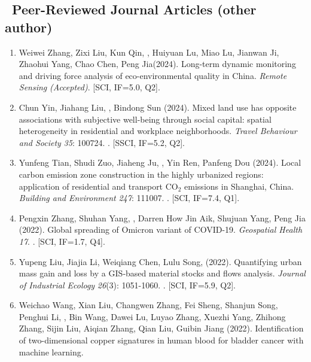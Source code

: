 \subsection*{\texorpdfstring{\faBook\ Peer-Reviewed Journal Articles (other author)}{Other Peer-Reviewed Journal Articles (other author)}}
\begin{enumerate}
\item
    Weiwei Zhang, Zixi Liu, Kun Qin, \Shaoqing, Huiyuan Lu, Miao Lu, Jianwan Ji, Zhaohui Yang, Chao Chen, Peng Jia\CS (2024).
    Long-term dynamic monitoring and driving force analysis of eco-environmental quality in China. 
    \textit{Remote Sensing} \textit{(Accepted)}. [SCI, IF=5.0, Q2].
\item
    Chun Yin, Jiahang Liu, \Shaoqing, Bindong Sun (2024).
    Mixed land use has opposite associations with subjective well-being through social capital: spatial heterogeneity in residential and workplace neighborhoods.
    \textit{Travel Behaviour and Society} \textit{35}: 100724.
    . [SSCI, IF=5.2, Q2].
\item
    Yunfeng Tian, Shudi Zuo, Jiaheng Ju, \Shaoqing, Yin Ren, Panfeng Dou (2024).
    Local carbon emission zone construction in the highly urbanized regions: application of residential and transport CO$_2$ emissions in Shanghai, China.
    \textit{Building and Environment} \textit{247}: 111007.
    . [SCI, IF=7.4, Q1].
\item
    Pengxin Zhang, Shuhan Yang, \Shaoqing, Darren How Jin Aik, Shujuan Yang, Peng Jia (2022).
    Global spreading of Omicron variant of COVID-19.
    \textit{Geospatial Health} \textit{17}.
    . [SCI, IF=1.7, Q4].
\item
    Yupeng Liu, Jiajia Li, Weiqiang Chen, Lulu Song, \Shaoqing \enspace (2022).
    Quantifying urban mass gain and loss by a GIS‐based material stocks and flows analysis.
    \textit{Journal of Industrial Ecology} \textit{26}(3): 1051-1060.
    . [SCI, IF=5.9, Q2].
\item
    Weichao Wang, Xian Liu, Changwen Zhang, Fei Sheng, Shanjun Song, Penghui Li, \Shaoqing, Bin Wang, Dawei Lu, Luyao Zhang, Xuezhi Yang, Zhihong Zhang, Sijin Liu, Aiqian Zhang, Qian Liu, Guibin Jiang (2022).
    Identification of two-dimensional copper signatures in human blood for bladder cancer with machine learning.

\end{enumerate}
